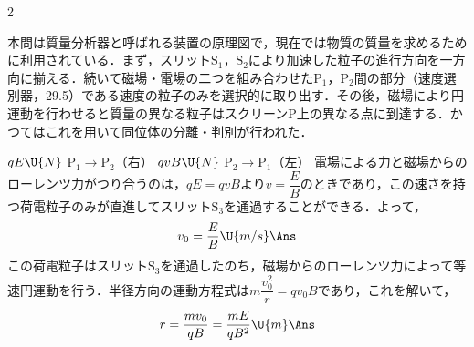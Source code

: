 \begin{multicols}{2}
\par\nopagebreak
\begin{sisin}
本問は質量分析器と呼ばれる装置の原理図で，現在では物質の質量を求めるために利用されている．まず，スリット$\mathrm{S}_1$，$\mathrm{S}_2$により加速した粒子の進行方向を一方向に揃える．続いて磁場・電場の二つを組み合わせた$\mathrm{P}_1$，$\mathrm{P}_2$間の部分（速度選別器，29.5）である速度の粒子のみを選択的に取り出す．その後，磁場により円運動を行わせると質量の異なる粒子はスクリーン$\mathrm{P}$上の異なる点に到達する．かつてはこれを用いて同位体の分離・判別が行われた．
\end{sisin}
\KaiHead
\begin{komon}
 $qE\U{N}$\Ans
{} $\mathrm{P}_1\to\mathrm{P}_2$（右）\Ans
{} $qvB\U{N}$\Ans
{} $\mathrm{P}_2\to\mathrm{P}_1$（左）\Ans
{} 電場による力と磁場からのローレンツ力がつり合うのは，$qE=qvB$より$v=\dfrac{E}{B}$のときであり，この速さを持つ荷電粒子のみが直進してスリット$\mathrm{S}_3$を通過することができる．よって，
       \[v_0=\frac{E}{B}\U{m/s}\Ans\]
 この荷電粒子はスリット$\mathrm{S}_3$を通過したのち，磁場からのローレンツ力によって等速円運動を行う．半径方向の運動方程式は$m\dfrac{v_0^2}{r}=qv_0B$であり，これを解いて，
       \[r=\frac{mv_0}{qB}=\frac{mE}{qB^2}\U{m}\Ans\]
\end{komon}


\end{multicols}

